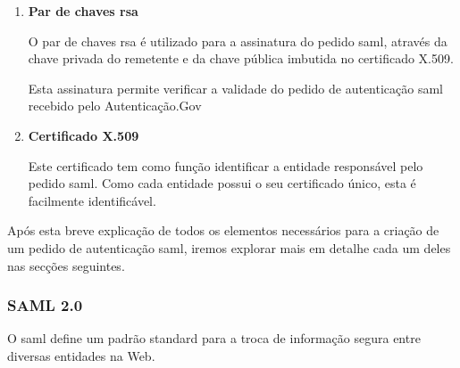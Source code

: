 \begin{enumerate}
    A utilização de canais cifrados, associado ao formato específico \gls{saml} garante que a troca de dados segue as seguintes considerações:
    
    \begin{enumerate}
        \item \textbf{Privacidade de dados}
        
        A utilização de canais cifrados garante que os dados do utilizador se mantêm privados, impedindo a sua visualização por terceiros (ex. visualização de dados por sniffer de rede);
        \item \textbf{Integridade de dados}
        
        O protocolo \gls{saml}, através de assinatura digital nos pedidos e respostas de autenticação, garante a integridade de dados de modificações não autorizadas (ex. ataque por \emph{Man-in-the Middle})\footnote{Para mais informações: \url{https://pt.wikipedia.org/wiki/Ataque_man-in-the-middle}}.
    \end{enumerate}
    
    \item \textbf{Par de chaves \gls{rsa}}
    
    O par de chaves \gls{rsa} é utilizado para a assinatura do pedido \gls{saml}, através da chave privada do remetente e da chave pública imbutida no certificado X.509.
    
    Esta assinatura permite verificar a validade do pedido de autenticação \gls{saml} recebido pelo Autenticação.Gov

    \item \textbf{Certificado X.509}
    
    Este certificado tem como função identificar a entidade responsável pelo pedido \gls{saml}. Como cada entidade possui o seu certificado único, esta é facilmente identificável.
\end{enumerate}

Após esta breve explicação de todos os elementos necessários para a criação de um pedido de autenticação \gls{saml}, iremos explorar mais em detalhe cada um deles nas secções seguintes.

\cleardoublepage
\subsubsection{SAML 2.0} \label{saml_section}

O \gls{saml} define um padrão standard para a troca de informação segura entre diversas entidades na Web.

